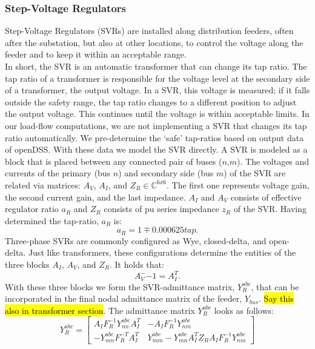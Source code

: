\documentclass[10pt,journal]{article}
\begin{document}
\subsubsection{Step-Voltage Regulators}
Step-Voltage Regulators (SVRs) are installed along distribution feeders, often after the substation, but also at other locations, to control the voltage along the feeder and to keep it within an acceptable range.  \\
In short, the SVR is an automatic transformer that can change its tap ratio. The tap ratio of a transformer is responsible for the voltage level at the secondary side of a transformer, the output voltage. In a SVR, this voltage is measured; if it falls outside the safety range, the tap ratio changes to a different position to adjust the output voltage. This continues until the voltage is within acceptable limits.
In our load-flow  computations, we are not implementing a SVR that changes its tap ratio automatically. We pre-determine the `safe' tap-ratios based on output data of openDSS. With these data we model the SVR directly. \newline
A SVR is modeled as a block that is placed between any connected pair of buses ($n$,$m$). The  voltages and currents of the primary (bus $n$) and secondary side (bus $m$) of the SVR are related via matrices:  $A_V$, $A_I$, and $Z_R\in\mathbb{C}^{6x6}$. The first one represents voltage gain, the second current gain, and the last impedance. $A_I$ and $A_V$ consists of effective regulator ratio $a_R$ and $Z_R$ consists of pu series impedance $z_R$ of the SVR. Having determined the tap-ratio, $a_R$ is:
\begin{equation}
    a_R = 1\mp 0.000625tap. 
\end{equation}Three-phase SVRs are commonly configured as Wye, closed-delta, and open-delta. Just like transformers, these configurations determine the entities of the three blocks $A_I$, $A_V$, and $Z_R$. It holds that:  \begin{equation}
    A_V^-{-1}=A_I^T.
\end{equation}
With these three blocks we form the SVR-admittance matrix, $Y^{abc}_{R}$, that can be incorporated in the final nodal admittance matrix of the feeder, $Y_{bus}$. \hl{Say this also in transformer section}. 
The admittance matrix $Y^{abc}_R$ looks as follows:
\begin{equation}Y^{abc}_{R}=
\begin{bmatrix}
A_I F_R^{-1}Y^{abc}_{nn}A_I^T & -A_I F_R^{-1}Y^{abc}_{nm} \\ 
-Y^{abc}_{mn}F_R^{-T}A_I^T & Y^{abc}_{mm}-Y^{abc}_{mn} A_I^TZ_RA_IF_R^{-1}Y^{abc}_{nm} 
\end{bmatrix}
\end{equation}
\end{document}

